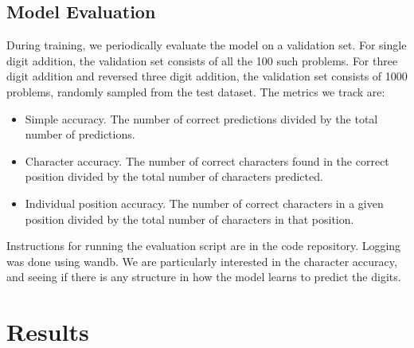 \documentclass[12pt]{article}
\begin{document}
\subsection{Model Evaluation}
During training, we periodically evaluate the model on a validation set.
For single digit addition, the validation set consists of all the 100 such problems.
For three digit addition and reversed three digit addition, the validation set consists of 1000 problems, randomly sampled from the test dataset.
The metrics we track are:
\begin{itemize}
    \item Simple accuracy. The number of correct predictions divided by the total number of predictions.
    \item Character accuracy. The number of correct characters found in the correct position divided by the total number of characters predicted.
    \item Individual position accuracy. The number of correct characters in a given position divided by the total number of characters in that position.
\end{itemize}
Instructions for running the evaluation script are in the code repository. Logging was done using wandb.
We are particularly interested in the character accuracy, and seeing if there is any structure in how the model learns to predict the digits.
\section{Results}
\end{document}
